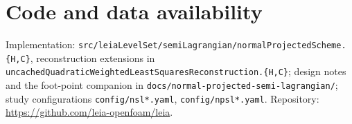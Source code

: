 \documentclass[preprint,3p,11pt]{elsarticle}
\begin{document}
\section*{Code and data availability}
Implementation: \texttt{src/leiaLevelSet/semiLagrangian/normalProjectedScheme.\{H,C\}},
reconstruction extensions in
\texttt{uncachedQuadraticWeightedLeastSquaresReconstruction.\{H,C\}}; design
notes and the foot-point companion in
\texttt{docs/normal-projected-semi-lagrangian/}; study configurations
\texttt{config/nsl*.yaml}, \texttt{config/npsl*.yaml}. Repository:
\url{https://github.com/leia-openfoam/leia}.
\end{document}

